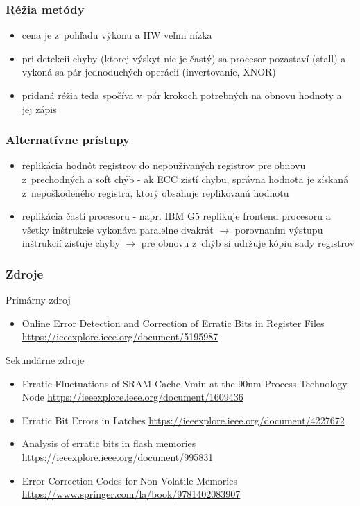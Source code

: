 \documentclass{beamer}
\begin{document}
\begin{frame}\frametitle{Réžia metódy}
\begin{itemize}
	\item cena je z~pohľadu výkonu a HW veľmi nízka
	\item pri detekcii chyby (ktorej výskyt nie je častý) sa procesor pozastaví (stall) a vykoná sa pár jednoduchých operácií (invertovanie, XNOR)
	\item pridaná réžia teda spočíva v~pár krokoch potrebných na obnovu hodnoty a jej zápis
\end{itemize}
\end{frame}

\begin{frame}\frametitle{Alternatívne prístupy}
\begin{itemize}
	\item replikácia hodnôt registrov do nepoužívaných registrov pre obnovu z~prechodných a soft chýb \-- ak ECC zistí chybu, správna hodnota je získaná z~nepoškodeného registra, ktorý obsahuje replikovanú hodnotu
	\item replikácia častí procesoru \-- napr. IBM G5 replikuje frontend procesoru a všetky inštrukcie vykonáva paralelne dvakrát $\rightarrow$ porovnaním výstupu inštrukcií zisťuje chyby  $\rightarrow$ pre obnovu z~chýb si udržuje kópiu sady registrov
\end{itemize}
\end{frame}

\begin{frame}\frametitle{Zdroje}
Primárny zdroj
\begin{itemize}
	\item Online Error Detection and Correction of Erratic
	Bits in Register Files
	\url{https://ieeexplore.ieee.org/document/5195987}
\end{itemize}
Sekundárne zdroje
\begin{itemize}
	\item Erratic Fluctuations of SRAM Cache Vmin at the 90nm Process Technology Node
	\url{https://ieeexplore.ieee.org/document/1609436}
	
	\item Erratic Bit Errors in Latches
	\url{https://ieeexplore.ieee.org/document/4227672}
	
	\item Analysis of erratic bits in flash memories
	\url{https://ieeexplore.ieee.org/document/995831}
	
	\item Error Correction Codes for Non-Volatile Memories
	\url{https://www.springer.com/la/book/9781402083907}
\end{itemize}
\end{frame}
\end{document}
